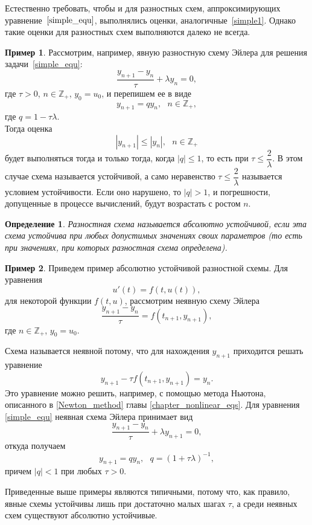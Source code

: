 \documentclass[11pt,a4paper,twoside,listtotoc,bibtotoc]{report}
\numberwithin{equation}{section}
\newtheorem*{definition}{Определение}
\theoremstyle{definition}
\newtheorem{example}{Пример}[section]
\theoremstyle{plain}
\begin{document}
Естественно требовать, чтобы и для разностных схем, аппроксимирующих
уравнение~$\eqref{simple_equ}$, выполнялись оценки, аналогичные~\eqref{simple1}.
Однако такие оценки для разностных схем выполняются далеко не всегда.

%
\begin{example}
%
    \label{5_4_example_1}
    Рассмотрим, например, явную разностную схему Эйлера для решения задачи~\eqref{simple_equ}:
    $$
        \dfrac{y_{n+1}-y_n}{\tau} + \lambda y_n = 0,
    $$
    где $\tau > 0$, $n \in \mathbb{Z}_+$, $y_0 = u_0$, и перепишем ее в виде
    $$
        y_{n+1} = qy_n,~~~n \in \mathbb{Z}_+,
    $$
    где $q = 1-\tau\lambda$.\\
    Тогда оценка
    $$
        |y_{n+1}| \leqslant |y_n|,~~~n \in \mathbb{Z}_+
    $$
    будет выполняться тогда и только тогда, когда $|q| \leqslant 1$, то есть при
    $\tau \leqslant \dfrac{2}{\lambda}$. В этом случае схема называется устойчивой,
    а само неравенство $\tau \leqslant \dfrac{2}{\lambda}$
    называется условием устойчивости. Если оно нарушено, то $|q|>1$, и погрешности,
    допущенные в процессе вычислений, будут возрастать с ростом $n$.
%
\end{example}
%
\begin{definition}
%
    Разностная схема называется абсолютно устойчивой,
    если эта схема устойчива при любых допустимых значениях своих параметров
    (то есть при значениях, при которых разностная схема определена).
%
\end{definition}
%

%
\begin{example}
%
Приведем пример абсолютно устойчивой разностной схемы. Для уравнения
%
\begin{equation}
%
    \label{5_4_2_example}
    u'(t)=f(t,u(t)),
%
\end{equation}
%
для некоторой функции $f(t,u)$, рассмотрим неявную схему Эйлера
%
$$
    \dfrac{y_{n+1}-y_n}{\tau} = f(t_{n+1},y_{n+1}),
$$
%
где $n \in \mathbb{Z}_+$, $y_0=u_0$.

Схема называется неявной потому, что для нахождения $y_{n+1}$ приходится
решать уравнение
%
$$
    y_{n+1}-\tau f(t_{n+1},y_{n+1}) = y_n.
$$
%
Это уравнение можно решить, например, с помощью метода Ньютона, описанного
в \ref{Newton_method} главы \ref{chapter_nonlinear_eqs}. Для уравнения
\eqref{simple_equ} неявная схема Эйлера принимает вид
%
$$
    \dfrac{y_{n+1}-y_n}{\tau} + \lambda y_{n+1} = 0,
$$
%
откуда получаем
%
$$
    y_{n+1}=qy_n,~~~q=(1+\tau\lambda)^{-1},
$$
%
причем $|q|<1$ при любых $\tau>0$.
%
\end{example}
%
Приведенные выше примеры являются типичными, потому что, как правило, явные
схемы устойчивы лишь при достаточно малых шагах $\tau$, а среди неявных схем
существуют абсолютно устойчивые.
\end{document}
